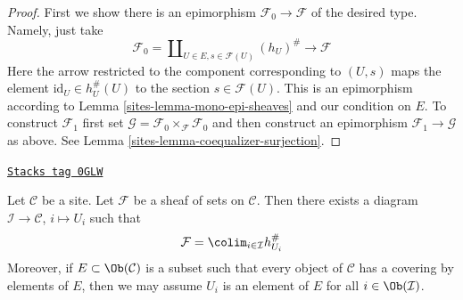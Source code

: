 \begin{proof}

First we show there is an epimorphism $\mathcal{F}_0 \to \mathcal{F}$
of the desired type. Namely, just take
$$
\mathcal{F}_0 =
\coprod\nolimits_{U \in E, s \in \mathcal{F}(U)}
(h_U)^\# \longrightarrow \mathcal{F}
$$
Here the arrow restricted to the component corresponding to $(U, s)$ maps
the element $\text{id}_U \in h_U^\#(U)$ to the section $s \in \mathcal{F}(U)$.
This is an epimorphism according to Lemma \ref{sites-lemma-mono-epi-sheaves} and
our condition on $E$. To construct $\mathcal{F}_1$ first set
$\mathcal{G} = \mathcal{F}_0 \times_\mathcal{F} \mathcal{F}_0$ and
then construct an epimorphism $\mathcal{F}_1 \to \mathcal{G}$
as above. See Lemma \ref{sites-lemma-coequalizer-surjection}.
\end{proof}

\begin{lemma}
\label{sites-lemma-colimit-representable}
\href{https://stacks.math.columbia.edu/tag/0GLW}{\texttt{Stacks tag 0GLW}}

Let $\mathcal{C}$ be a site. Let $\mathcal{F}$ be a sheaf of sets on
$\mathcal{C}$. Then there exists a diagram $\mathcal{I} \to \mathcal{C}$,
$i \mapsto U_i$ such that
$$
\mathcal{F} = \colim_{i \in \mathcal{I}} h_{U_i}^\#
$$
Moreover, if $E \subset \Ob(\mathcal{C})$ is a subset such that every
object of $\mathcal{C}$ has a covering by elements of $E$, then we may
assume $U_i$ is an element of $E$ for all $i \in \Ob(\mathcal{I})$.
\end{lemma}

